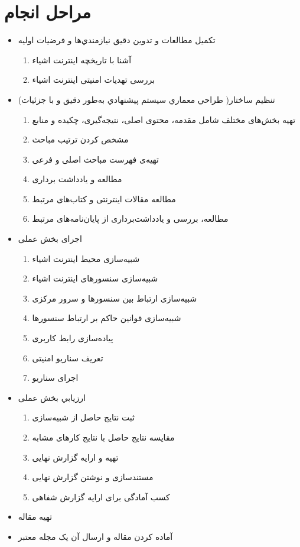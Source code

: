 \documentclass[aimcpersian]{aimc46}
\begin{document}
\section{مراحل انجام}
\begin{itemize}
\item 	تكميل مطالعات و تدوين دقيق نيازمندي‌ها و فرضيات  اوليه
  \begin{enumerate}
 \item	آشنا با تاریخچه اینترنت اشیاء 
 \item 	بررسی تهدیات امنیتی اینترنت اشیاء 
	\end{enumerate}
	\item 	تنظیم ساختار( طراحي معماري سيستم پيشنهادي به‌طور دقيق  و با جزئيات)
 \begin{enumerate}
 \item 	تهیه بخش‌های مختلف شامل مقدمه، محتوی اصلی، نتیجه‌گیری، چکیده و منابع 
 \item 	مشخص کردن ترتیب مباحث 
 \item 	تهیه‌ی فهرست مباحث اصلی و فرعی 
 \item 	مطالعه و یادداشت برداری 
 \item 	مطالعه مقالات اینترنتی و کتاب‌های مرتبط 
 \item 	مطالعه، بررسی و یادداشت‌برداری از پایان‌نامه‌های مرتبط 
\end{enumerate}
\item 	اجرای بخش عملی 
\begin{enumerate}
\item 	شبیه‌سازی محیط اینترنت اشیاء 
\item 	شبیه‌سازی سنسورهای اینترنت اشیاء 
\item 	شبیه‌سازی ارتباط بین سنسورها و سرور مرکزی 
\item 	شبیه‌سازی قوانین حاکم بر ارتباط سنسورها 
\item 	پیاده‌سازی رابط کاربری 
\item 	تعریف سناریو امنیتی 
\item 	اجرای سناریو 

\end{enumerate}
\item 	ارزيابي بخش عملی 
\begin{enumerate}
\item	ثبت نتایج حاصل از شبیه‌سازی 
\item	مقایسه نتایج حاصل با نتایج کارهای مشابه 
\item	تهیه و ارایه گزارش نهایی  
\item	مستندسازی و نوشتن گزارش نهایی 
\item	کسب آمادگی برای ارایه گزارش شفاهی 
\end{enumerate}
\item 	تهیه مقاله 
\item 	آماده کردن مقاله و ارسال آن یک مجله معتبر 
\end{itemize}
\newpage
\end{document}
